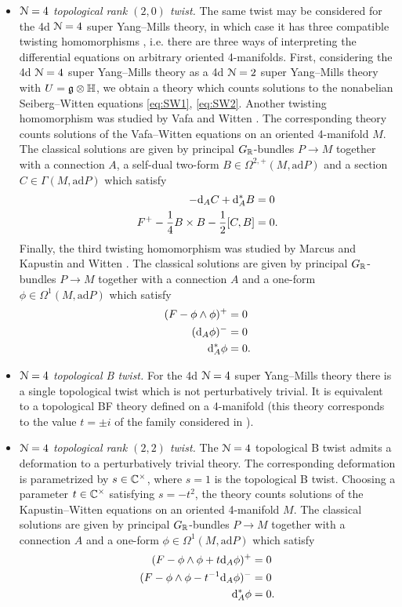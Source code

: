 \documentclass[10pt, oneside]{article}
\begin{document}
\begin{itemize}
\item \emph{$\mathcal N=4$ topological rank $(2, 0)$ twist.} The same twist may be considered for the 4d $\mathcal N=4$ super Yang--Mills theory, in which case it has three compatible twisting homomorphisms \cite{Yamron}, i.e. there are three ways of interpreting the differential equations on arbitrary oriented 4-manifolds. First, considering the 4d $\mathcal N=4$ super Yang--Mills theory as a 4d $\mathcal N=2$ super Yang--Mills theory with $U=\mathfrak g\otimes\mathbb{H}$, we obtain a theory which counts solutions to the nonabelian Seiberg--Witten equations \eqref{eq:SW1}, \eqref{eq:SW2}. Another twisting homomorphism was studied by Vafa and Witten \cite{VafaWitten}. The corresponding theory counts solutions of the Vafa--Witten equations on an oriented 4-manifold $M$. The classical solutions are given by principal $G_\mathbb R$-bundles $P\rightarrow M$ together with a connection $A$, a self-dual two-form $B\in\Omega^{2, +}(M, \mathrm{ad} P)$ and a section $C\in\Gamma(M, \mathrm{ad} P)$ which satisfy
\begin{align}
-{\rm d}_A C + {\rm d}_A^* B &= 0 \\
F^+ - \frac{1}{4}B\times B - \frac{1}{2}[C, B] &= 0.
\end{align}
Finally, the third twisting homomorphism was studied by Marcus \cite{Marcus} and Kapustin and Witten \cite{KapustinWitten}. The classical solutions are given by principal $G_\mathbb R$-bundles $P\rightarrow M$ together with a connection $A$ and a one-form $\phi\in\Omega^1(M, \mathrm{ad} P)$ which satisfy
\begin{align}
(F-\phi\wedge \phi)^+ &= 0\\
({\rm d}_A \phi)^- &= 0 \\
{\rm d}^*_A \phi &= 0.
\end{align}

 \item \emph{$\mathcal{N}=4$ topological B twist.} For the 4d $\mathcal N=4$ super Yang--Mills theory there is a single topological twist which is not perturbatively trivial. It is equivalent to a topological BF theory defined on a 4-manifold (this theory corresponds to the value $t=\pm i$ of the family considered in \cite{KapustinWitten}).
 
 \item \emph{$\mathcal N=4$ topological rank $(2, 2)$ twist.} The $\mathcal N=4$ topological B twist admits a deformation to a perturbatively trivial theory. The corresponding deformation is parametrized by $s\in\mathbb C^\times$, where $s=1$ is the topological B twist. Choosing a parameter $t\in\mathbb C^\times$ satisfying $s=-t^2$, the theory counts solutions of the Kapustin--Witten equations on an oriented 4-manifold $M$. The classical solutions are given by principal $G_\mathbb R$-bundles $P\rightarrow M$ together with a connection $A$ and a one-form $\phi\in\Omega^1(M, \mathrm{ad} P)$ which satisfy
\begin{align}
(F-\phi\wedge\phi +t {\rm d}_A \phi)^+ &= 0 \\
(F-\phi\wedge\phi -t^{-1}{\rm d}_A \phi)^- &= 0 \\
{\rm d}^*_A \phi &= 0.
\end{align}


\end{itemize}
\end{document}
